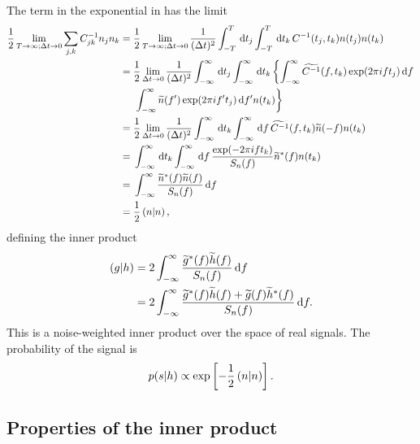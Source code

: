 The term in the exponential in  has the limit
\begin{align}
\recip{2}\lim_{T \rightarrow \infty; \upDelta t \rightarrow 0} \sum_{j,k}C^{-1}_{jk}n_j n_k = {} & \recip{2}\lim_{T \rightarrow \infty; \upDelta t \rightarrow 0} \recip{(\upDelta t)^2}\int_{-T}^{T}\,\dd t_j \int_{-T}^{T}\,\dd t_k \, C^{-1}(t_j,t_k) n(t_j)n(t_k) \nonumber \\
 = {} & \recip{2}\lim_{\upDelta t \rightarrow 0} \recip{(\upDelta t)^2}\int_{-\infty}^{\infty}\,\dd t_j \int_{-\infty}^{\infty}\,\dd t_k \left\{ \intd{-\infty}{\infty}{\widetilde{C^{-1}}(f,t_k)\exp(2\pi if t_j)}{f} \right. \nonumber \\*
 {} & \left. \intd{-\infty}{\infty}{\widetilde{n}(f')\exp(2\pi i f't_j)}{f'}n(t_k)\right\} \nonumber \\
 = {} & \recip{2}\lim_{\upDelta t \rightarrow 0} \recip{(\upDelta t)^2} \int_{-\infty}^{\infty}\,\dd t_k \int_{-\infty}^{\infty}\,\dd f \, \widetilde{C^{-1}}(f,t_k)\widetilde{n}(-f)n(t_k) \nonumber \\
 = {} & \int_{-\infty}^{\infty}\,\dd t_k \int_{-\infty}^{\infty}\,\dd f \, \frac{\exp(-2\pi i f t_k)}{S_n(f)}\widetilde{n}^\ast(f)n(t_k) \nonumber \\
 = {} & \intd{-\infty}{\infty}{\frac{\widetilde{n}^\ast(f)\widetilde{n}(f)}{S_n(f)}}{f} \nonumber \\
 = {} & \recip{2}\innerprod{n}{n},
 \end{align}
defining the inner product
\begin{align}
\left({g}\middle|{h}\right) = {} & 2\int_{-\infty}^{\infty}{\frac{\widetilde{g}^\ast(f)\widetilde{h}(f)}{S_n(f)}}\,\mathrm{d}{f} \\
 = {} & 2 \int_{-\infty}^{\infty}{\frac{\widetilde{g}^\ast(f)\widetilde{h}(f) + \widetilde{g}(f)\widetilde{h}^\ast(f)}{S_n(f)}}\,\mathrm{d}{f}.
\end{align}
This is a noise-weighted inner product over the space of real signals. The probability of the signal is
\begin{equation}
p(s|h) \propto \exp\left[-\frac{1}{2}\left({n}\middle|{n}\right)\right].
\end{equation}

\subsection{Properties of the inner product}

